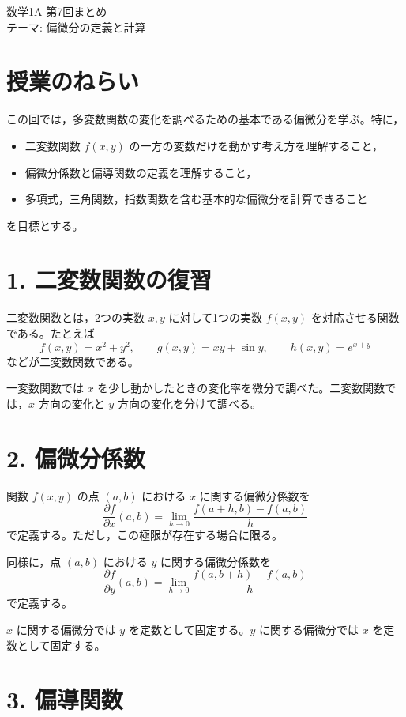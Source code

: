 \documentclass[a4paper,11pt]{jsarticle}
\begin{document}
\begin{center}
{\LARGE 数学1A 第7回まとめ}\\[0.4em]
テーマ: 偏微分の定義と計算
\end{center}

\section*{授業のねらい}

この回では，多変数関数の変化を調べるための基本である偏微分を学ぶ。特に，
\begin{itemize}[leftmargin=2em]
\item 二変数関数 $f(x,y)$ の一方の変数だけを動かす考え方を理解すること，
\item 偏微分係数と偏導関数の定義を理解すること，
\item 多項式，三角関数，指数関数を含む基本的な偏微分を計算できること
\end{itemize}
を目標とする。

\section*{1. 二変数関数の復習}

二変数関数とは，2つの実数 $x,y$ に対して1つの実数 $f(x,y)$ を対応させる関数である。たとえば
\[
f(x,y)=x^2+y^2,\qquad
g(x,y)=xy+\sin y,\qquad
h(x,y)=e^{x+y}
\]
などが二変数関数である。

一変数関数では $x$ を少し動かしたときの変化率を微分で調べた。二変数関数では，$x$ 方向の変化と $y$ 方向の変化を分けて調べる。

\section*{2. 偏微分係数}

関数 $f(x,y)$ の点 $(a,b)$ における $x$ に関する偏微分係数を
\[
\frac{\partial f}{\partial x}(a,b)
=\lim_{h\to 0}\frac{f(a+h,b)-f(a,b)}{h}
\]
で定義する。ただし，この極限が存在する場合に限る。

同様に，点 $(a,b)$ における $y$ に関する偏微分係数を
\[
\frac{\partial f}{\partial y}(a,b)
=\lim_{h\to 0}\frac{f(a,b+h)-f(a,b)}{h}
\]
で定義する。

$x$ に関する偏微分では $y$ を定数として固定する。$y$ に関する偏微分では $x$ を定数として固定する。

\section*{3. 偏導関数}
\end{document}
